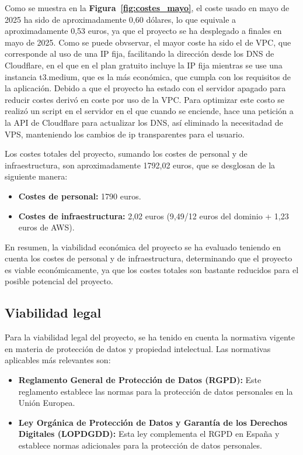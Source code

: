 Como se muestra en la \textbf{Figura~\ref{fig:costes_mayo}}, el coste usado en mayo de 2025 ha sido de aproximadamente 0,60 dólares, lo que equivale a aproximadamente 0,53 euros, ya que el proyecto se ha desplegado a finales en mayo de 2025. Como se puede obvservar, el mayor coste ha sido el de VPC, que corresponde al uso de una IP fija, facilitando la dirección desde los DNS de Cloudflare, en el que en el plan gratuito incluye la IP fija mientras se use una instancia t3.medium, que es la más económica, que cumpla con los requisitos de la aplicación. Debido a que el proyecto ha estado con el servidor apagado para reducir costes derivó en coste por uso de la VPC. Para optimizar este costo se realizó un script en el servidor en el que cuando se enciende, hace una petición a la API de Cloudflare para actualizar los DNS, así eliminado la necesitadad de VPS, manteniendo los cambios de ip transparentes para el usuario.


Los costes totales del proyecto, sumando los costes de personal y de infraestructura, son aproximadamente 1792,02 euros, que se desglosan de la siguiente manera:
\begin{itemize}
    \item \textbf{Costes de personal:} 1790 euros.
    \item \textbf{Costes de infraestructura:} 2,02 euros (9,49/12 euros del dominio + 1,23 euros de AWS).
\end{itemize}


En resumen, la viabilidad económica del proyecto se ha evaluado teniendo en cuenta los costes de personal y de infraestructura, determinando que el proyecto es viable económicamente, ya que los costes totales son bastante reducidos para el posible potencial del proyecto.

\subsection{Viabilidad legal}
Para la viabilidad legal del proyecto, se ha tenido en cuenta la normativa vigente en materia de protección de datos y propiedad intelectual.
Las normativas aplicables más relevantes son:
\begin{itemize}
    \item \textbf{Reglamento General de Protección de Datos (RGPD):} Este reglamento establece las normas para la protección de datos personales en la Unión Europea.~\cite{RGPD}
    \item \textbf{Ley Orgánica de Protección de Datos y Garantía de los Derechos Digitales (LOPDGDD):} Esta ley complementa el RGPD en España y establece normas adicionales para la protección de datos personales.~\cite{LOPDGDD}	
\end{itemize}

